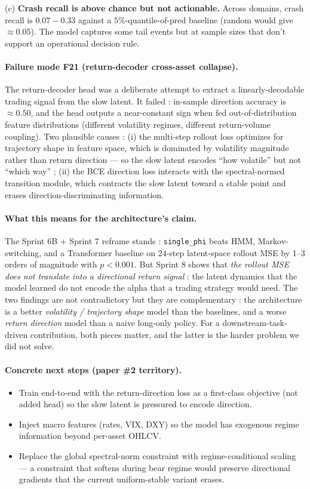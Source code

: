 \documentclass[11pt,a4paper]{article}
\begin{document}
(c) \textbf{Crash recall is above chance but not actionable.}
Across domains, crash recall is $0.07{-}0.33$ against a
$5\%$-quantile-of-pred baseline (random would give $\approx
0.05$). The model captures some tail events but at sample
sizes that don't support an operational decision rule.

\paragraph{Failure mode F21 (return-decoder cross-asset collapse).}
The return-decoder head was a deliberate attempt to extract a
linearly-decodable trading signal from the slow latent. It
failed : in-sample direction accuracy is $\approx 0.50$, and
the head outputs a near-constant sign when fed
out-of-distribution feature distributions (different volatility
regimes, different return-volume coupling). Two plausible causes :
(i) the multi-step rollout loss optimizes for trajectory shape
in feature space, which is dominated by volatility magnitude
rather than return direction --- so the slow latent encodes
``how volatile'' but not ``which way'' ; (ii) the BCE direction
loss interacts with the spectral-normed transition module, which
contracts the slow latent toward a stable point and erases
direction-discriminating information.

\paragraph{What this means for the architecture's claim.}
The Sprint 6B + Sprint 7 reframe stands : \texttt{single\_phi}
beats HMM, Markov-switching, and a Transformer baseline on
24-step latent-space rollout MSE by 1--3 orders of magnitude
with $p {<} 0.001$. But Sprint 8 shows that \emph{the rollout MSE
does not translate into a directional return signal} : the latent
dynamics that the model learned do not encode the alpha that a
trading strategy would need. The two findings are not
contradictory but they are complementary : the architecture is a
better \emph{volatility / trajectory shape} model than the
baselines, and a worse \emph{return direction} model than a
naive long-only policy. For a downstream-task-driven contribution,
both pieces matter, and the latter is the harder problem we did
not solve.

\paragraph{Concrete next steps (paper \#2 territory).}
\begin{itemize}[leftmargin=*]
\item Train end-to-end with the return-direction loss as a
  first-class objective (not added head) so the slow latent is
  pressured to encode direction.
\item Inject macro features (rates, VIX, DXY) so the model has
  exogenous regime information beyond per-asset OHLCV.
\item Replace the global spectral-norm constraint with
  regime-conditional scaling --- a constraint that softens during
  bear regime would preserve directional gradients that the
  current uniform-stable variant erases.
\end{itemize}
\end{document}
